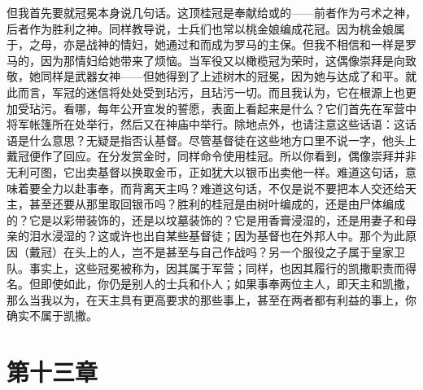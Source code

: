 但我首先要就冠冕本身说几句话。这顶桂冠是奉献给或的——前者作为弓术之神，后者作为胜利之神。同样教导说，士兵们也常以桃金娘编成花冠。因为桃金娘属于，之母，亦是战神的情妇，她通过和而成为罗马的主保。但我不相信和一样是罗马的，因为那情妇给她带来了烦恼。当军役又以橄榄冠为荣时，这偶像崇拜是向致敬，她同样是武器女神——但她得到了上述树木的冠冕，因为她与达成了和平。就此而言，军冠的迷信将处处受到玷污，且玷污一切。而且我认为，它在根源上也更加受玷污。看哪，每年公开宣发的誓愿，表面上看起来是什么？它们首先在军营中将军帐篷所在处举行，然后又在神庙中举行。除地点外，也请注意这些话语：这话语是什么意思？无疑是指否认基督。尽管基督徒在这些地方口里不说一字，他头上戴冠便作了回应。在分发赏金时，同样命令使用桂冠。所以你看到，偶像崇拜并非无利可图，它出卖基督以换取金币，正如犹大以银币出卖他一样。难道这句话，意味着要全力以赴事奉，而背离天主吗？难道这句话，不仅是说不要把本人交还给天主，甚至还要从那里取回银币吗？胜利的桂冠是由树叶编成的，还是由尸体编成的？它是以彩带装饰的，还是以坟墓装饰的？它是用香膏浸湿的，还是用妻子和母亲的泪水浸湿的？这或许也出自某些基督徒；因为基督也在外邦人中。那个为此原因（戴冠）在头上的人，岂不是甚至与自己作战吗？另一个服役之子属于皇家卫队。事实上，这些冠冕被称为，因其属于军营；同样，也因其履行的凯撒职责而得名。但即使如此，你仍是别人的士兵和仆人；如果事奉两位主人，即天主和凯撒，那么当我以为，在天主具有更高要求的那些事上，甚至在两者都有利益的事上，你确实不属于凯撒。\par


\section{第十三章}

